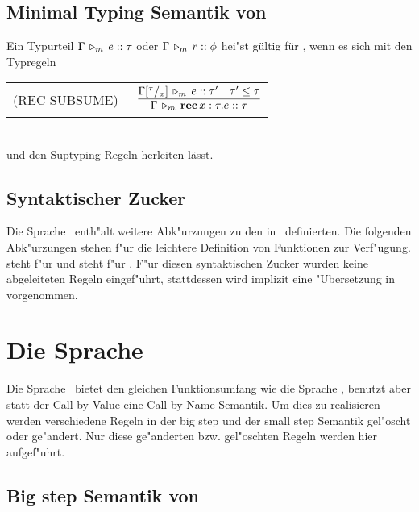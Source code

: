 \subsection{Minimal Typing Semantik von \LTWO}

  Ein Typurteil $\Gamma\,\triangleright_m\,e\mathrel{::}\tau$ oder $\Gamma\,\triangleright_m\,r\mathrel{::}\phi$ hei"st g\"ultig f\"ur \LTWO,
  wenn es sich mit den Typregeln \\[5mm]
  \begin{tabular}{ll} 
    \mbox{(REC-SUBSUME)\ }  & $\RULE{\Tjm{\Gamma\SUB{\tau}{x}}{e}{\tau'} \quad \tau' \le \tau}
                              {\Tjm{\Gamma}{\expRec{x:\tau}{e}}{\tau}}$ \\[4mm]
  \end{tabular} \\[7mm]
  und den Suptyping Regeln herleiten l\"asst.


\subsection{Syntaktischer Zucker}

Die Sprache \LTWO\ enth"alt weitere Abk"urzungen zu den in \LONE\ definierten. Die folgenden Abk"urzungen stehen f"ur
die leichtere Definition von Funktionen zur Verf"ugung.
\beqns
\eeqns
steht f"ur
\beqns
\eeqns
und
\beqns
\eeqns
steht f"ur
\beqns
  \mbox{.}
\eeqns
F"ur diesen syntaktischen Zucker wurden keine abgeleiteten Regeln eingef"uhrt, stattdessen wird implizit
eine "Ubersetzung in  vorgenommen.



\section{Die Sprache \LTWOCBN}

Die Sprache \LTWOCBN \ bietet den gleichen Funktionsumfang wie die Sprache \LTWO, benutzt aber statt der 
Call by Value eine Call by Name Semantik. Um dies zu realisieren werden verschiedene Regeln in der big step 
und der small step Semantik gel"oscht oder ge"andert. Nur diese ge"anderten bzw. gel"oschten Regeln werden hier
aufgef"uhrt.

\subsection{Big step Semantik von \LTWOCBN}

